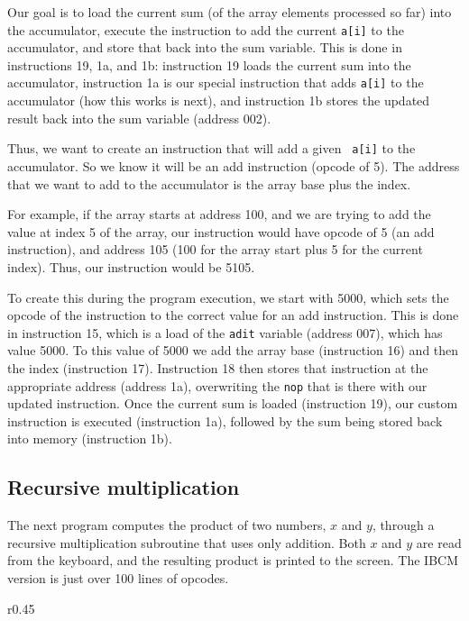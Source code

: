Our goal is to load the current sum (of the array elements processed
so far) into the accumulator, execute the instruction to add the
current {\tt a[i]} to the accumulator, and store that back into the
sum variable.  This is done in instructions 19, 1a, and 1b:
instruction 19 loads the current sum into the accumulator, instruction
1a is our special instruction that adds {\tt a[i]} to the accumulator
(how this works is next), and instruction 1b stores the updated result
back into the sum variable (address 002).

Thus, we want to create an instruction that will add a given {\tt
  a[i]} to the accumulator.  So we know it will be an add instruction
(opcode of 5).  The address that we want to add to the accumulator is
the array base plus the index.

For example, if the array starts at address 100, and we are trying to
add the value at index 5 of the array, our instruction would have
opcode of 5 (an add instruction), and address 105 (100 for the array
start plus 5 for the current index).  Thus, our instruction would be
5105.

To create this during the program execution, we start with 5000, which
sets the opcode of the instruction to the correct value for an add
instruction.  This is done in instruction 15, which is a load of the
{\tt adit} variable (address 007), which has value 5000.  To this
value of 5000 we add the array base (instruction 16) and then the
index (instruction 17).  Instruction 18 then stores that instruction
at the appropriate address (address 1a), overwriting the {\tt nop}
that is there with our updated instruction.  Once the current sum is
loaded (instruction 19), our custom instruction is executed
(instruction 1a), followed by the sum being stored back into memory
(instruction 1b).


\subsection{Recursive multiplication}

The next program computes the product of two numbers, $x$ and $y$,
through a recursive multiplication subroutine that uses only addition.
Both $x$ and $y$ are read from the keyboard, and the resulting product
is printed to the screen. The IBCM version is just over 100 lines of
opcodes.

\begin{wrapfigure}{r}{0.45\textwidth}
\vspace{-0.15in}

\vspace{-0.4in}
\end{wrapfigure}

